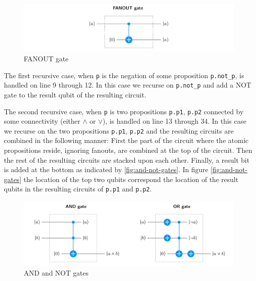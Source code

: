\begin{figure}[H]
    \centering
    \includegraphics[width=\textwidth]{figures/FANOUT-with-CNOT.jpg}
    \caption{FANOUT gate}
    \label{fig:fanout}
\end{figure}

The first recursive case, when \texttt{p} is the negation of some proposition \texttt{p.not\_p}, is handled on line 9 through 12.
In this case we recurse on \texttt{p.not\_p} and add a NOT gate to the result qubit of the resulting circuit.

The second recursive case, when \texttt{p} is two propositions \texttt{p.p1}, \texttt{p.p2} connected by some connectivity (either $\land$ or $\lor$), is handled on line 13 through 34.
In this case we recurse on the two propositions \texttt{p.p1}, \texttt{p.p2} and the resulting circuits are combined in the following manner:
First the part of the circuit where the atomic propositions reside, ignoring fanouts, are combined at the top of the circuit.
Then the rest of the resulting circuits are stacked upon each other.
Finally, a result bit is added at the bottom as indicated by \autoref{fig:and-not-gates}.
In figure \autoref{fig:and-not-gates} the location of the top two qubits correspond the location of the result qubits in the resulting circuits of \texttt{p.p1} and \texttt{p.p2}.

\begin{figure}[H]
    \centering
    \includegraphics[width=\textwidth]{figures/AND-and-OR-with-Toffoli.jpg}
    \caption{AND and NOT gates}
    \label{fig:and-not-gates}
\end{figure}

